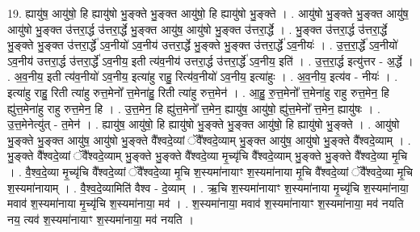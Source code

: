 \documentclass[17pt]{extarticle}
\begin{document}
19. ह्यायु॑ष॒ आयु॑षो॒ हि ह्यायु॑षो भु॒ङ्क्ते भु॒ङ्क्त आयु॑षो॒ हि ह्यायु॑षो भु॒ङ्क्ते । . आयु॑षो भु॒ङ्क्ते भु॒ङ्क्त आयु॑ष॒ आयु॑षो भु॒ङ्क्त उ॑त्तरा॒र्द्ध उ॑त्तरा॒र्द्धे भु॒ङ्क्त आयु॑ष॒ आयु॑षो भु॒ङ्क्त उ॑त्तरा॒र्द्धे । . भु॒ङ्क्त उ॑त्तरा॒र्द्ध उ॑त्तरा॒र्द्धे भु॒ङ्क्ते भु॒ङ्क्त उ॑त्तरा॒र्द्धे॑ ऽव॒नीयो॑ ऽव॒नीय॑ उत्तरा॒र्द्धे भु॒ङ्क्ते भु॒ङ्क्त उ॑त्तरा॒र्द्धे॑ ऽव॒नीयः॑ । . उ॒त्त॒रा॒र्द्धे॑ ऽव॒नीयो॑ ऽव॒नीय॑ उत्तरा॒र्द्ध उ॑त्तरा॒र्द्धे॑ ऽव॒नीय॒ इती त्य॑व॒नीय॑ उत्तरा॒र्द्ध उ॑त्तरा॒र्द्धे॑ ऽव॒नीय॒ इति॑ । . उ॒त्त॒रा॒र्द्ध इत्यु॑त्तर - अ॒र्द्धे । . अ॒व॒नीय॒ इती त्य॑व॒नीयो॑ ऽव॒नीय॒ इत्या॑हु राहु॒ रित्य॑व॒नीयो॑ ऽव॒नीय॒ इत्या॑हुः । . अ॒व॒नीय॒ इत्य॑व - नीयः॑ । . इत्या॑हु राहु॒ रिती त्या॑हु रुत्त॒मेनो᳚ त्त॒मेना॑हु॒ रिती त्या॑हु रुत्त॒मेन॑ । . आ॒हु॒ रु॒त्त॒मेनो᳚ त्त॒मेना॑हु राहु रुत्त॒मेन॒ हि ह्यु॑त्त॒मेना॑हु राहु रुत्त॒मेन॒ हि । . उ॒त्त॒मेन॒ हि ह्यु॑त्त॒मेनो᳚ त्त॒मेन॒ ह्यायु॑ष॒ आयु॑षो॒ ह्यु॑त्त॒मेनो᳚ त्त॒मेन॒ ह्यायु॑षः । . उ॒त्त॒मेनेत्यु॑त् - त॒मेन॑ । . ह्यायु॑ष॒ आयु॑षो॒ हि ह्यायु॑षो भु॒ङ्क्ते भु॒ङ्क्त आयु॑षो॒ हि ह्यायु॑षो भु॒ङ्क्ते । . आयु॑षो भु॒ङ्क्ते भु॒ङ्क्त आयु॑ष॒ आयु॑षो भु॒ङ्क्ते वै᳚श्वदे॒व्यां ॅवै᳚श्वदे॒व्याम् भु॒ङ्क्त आयु॑ष॒ आयु॑षो भु॒ङ्क्ते वै᳚श्वदे॒व्याम् । . भु॒ङ्क्ते वै᳚श्वदे॒व्यां ॅवै᳚श्वदे॒व्याम् भु॒ङ्क्ते भु॒ङ्क्ते वै᳚श्वदे॒व्या मृ॒च्यृ॑चि वै᳚श्वदे॒व्याम् भु॒ङ्क्ते भु॒ङ्क्ते वै᳚श्वदे॒व्या मृ॒चि । . वै॒श्व॒दे॒व्या मृ॒च्यृ॑चि वै᳚श्वदे॒व्यां ॅवै᳚श्वदे॒व्या मृ॒चि श॒स्यमा॑नायाꣳ श॒स्यमा॑नाया मृ॒चि वै᳚श्वदे॒व्यां ॅवै᳚श्वदे॒व्या मृ॒चि श॒स्यमा॑नायाम् । . वै॒श्व॒दे॒व्यामिति॑ वैश्व - दे॒व्याम् । . ऋ॒चि श॒स्यमा॑नायाꣳ श॒स्यमा॑नाया मृ॒च्यृ॑चि श॒स्यमा॑नाया॒ मवाव॑ श॒स्यमा॑नाया मृ॒च्यृ॑चि श॒स्यमा॑नाया॒ मव॑ । . श॒स्यमा॑नाया॒ मवाव॑ श॒स्यमा॑नायाꣳ श॒स्यमा॑नाया॒ मव॑ नयति नय॒ त्यव॑ श॒स्यमा॑नायाꣳ श॒स्यमा॑नाया॒ मव॑ नयति । \newline
\end{document}
